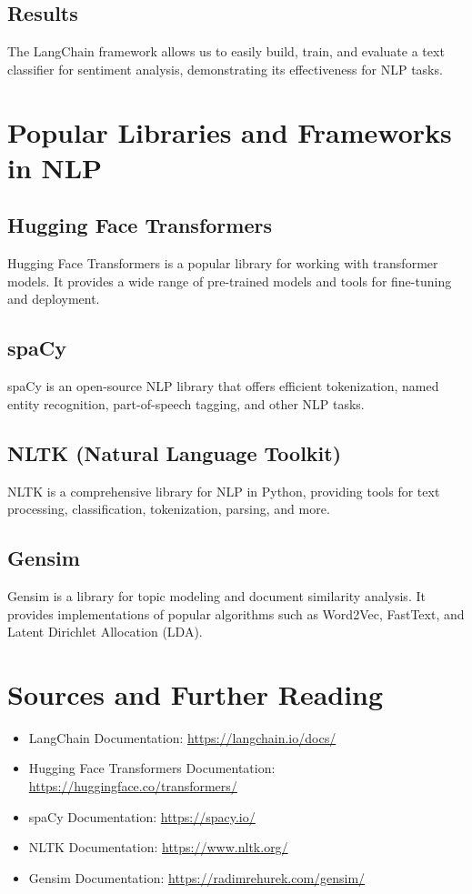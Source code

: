 \subsection{Results}
The LangChain framework allows us to easily build, train, and evaluate a text classifier for sentiment analysis, demonstrating its effectiveness for NLP tasks.

\section{Popular Libraries and Frameworks in NLP}

\subsection{Hugging Face Transformers}
Hugging Face Transformers is a popular library for working with transformer models. It provides a wide range of pre-trained models and tools for fine-tuning and deployment.

\subsection{spaCy}
spaCy is an open-source NLP library that offers efficient tokenization, named entity recognition, part-of-speech tagging, and other NLP tasks.

\subsection{NLTK (Natural Language Toolkit)}
NLTK is a comprehensive library for NLP in Python, providing tools for text processing, classification, tokenization, parsing, and more.

\subsection{Gensim}
Gensim is a library for topic modeling and document similarity analysis. It provides implementations of popular algorithms such as Word2Vec, FastText, and Latent Dirichlet Allocation (LDA).

\section{Sources and Further Reading}
\begin{itemize}
    \item LangChain Documentation: \url{https://langchain.io/docs/}
    \item Hugging Face Transformers Documentation: \url{https://huggingface.co/transformers/}
    \item spaCy Documentation: \url{https://spacy.io/}
    \item NLTK Documentation: \url{https://www.nltk.org/}
    \item Gensim Documentation: \url{https://radimrehurek.com/gensim/}
\end{itemize}

